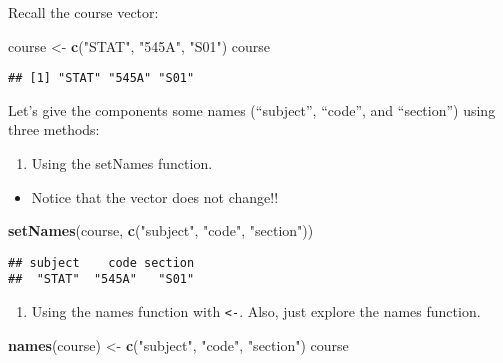 \documentclass[]{article}
\newenvironment{Shaded}{\begin{snugshade}}{\end{snugshade}}
\newcommand{\KeywordTok}[1]{\textcolor[rgb]{0.13,0.29,0.53}{\textbf{#1}}}
\newcommand{\StringTok}[1]{\textcolor[rgb]{0.31,0.60,0.02}{#1}}
\newcommand{\NormalTok}[1]{#1}
\providecommand{\tightlist}{%
  \setlength{\itemsep}{0pt}\setlength{\parskip}{0pt}}
\begin{document}
Recall the course vector:

\begin{Shaded}
\begin{Highlighting}[]
\NormalTok{course <-}\StringTok{ }\KeywordTok{c}\NormalTok{(}\StringTok{"STAT"}\NormalTok{, }\StringTok{"545A"}\NormalTok{, }\StringTok{"S01"}\NormalTok{)}
\NormalTok{course}
\end{Highlighting}
\end{Shaded}

\begin{verbatim}
## [1] "STAT" "545A" "S01"
\end{verbatim}

Let's give the components some names (``subject'', ``code'', and
``section'') using three methods:

\begin{enumerate}
\def\labelenumi{\arabic{enumi}.}
\tightlist
\item
  Using the setNames function.
\end{enumerate}

\begin{itemize}
\tightlist
\item
  Notice that the vector does not change!!
\end{itemize}

\begin{Shaded}
\begin{Highlighting}[]
\KeywordTok{setNames}\NormalTok{(course, }\KeywordTok{c}\NormalTok{(}\StringTok{"subject"}\NormalTok{, }\StringTok{"code"}\NormalTok{, }\StringTok{"section"}\NormalTok{))}
\end{Highlighting}
\end{Shaded}

\begin{verbatim}
## subject    code section 
##  "STAT"  "545A"   "S01"
\end{verbatim}

\begin{enumerate}
\def\labelenumi{\arabic{enumi}.}
\setcounter{enumi}{1}
\tightlist
\item
  Using the names function with \texttt{\textless{}-}. Also, just
  explore the names function.
\end{enumerate}

\begin{Shaded}
\begin{Highlighting}[]
\KeywordTok{names}\NormalTok{(course) <-}\StringTok{ }\KeywordTok{c}\NormalTok{(}\StringTok{"subject"}\NormalTok{, }\StringTok{"code"}\NormalTok{, }\StringTok{"section"}\NormalTok{)}
\NormalTok{course}
\end{Highlighting}
\end{Shaded}
\end{document}
